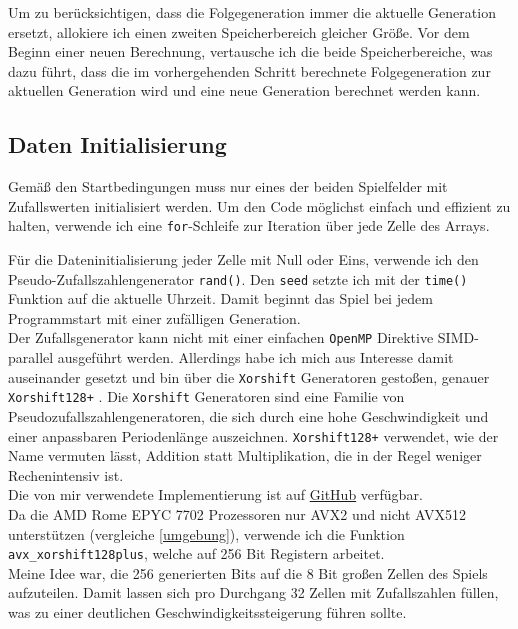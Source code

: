 \documentclass[german,plainarticle,hyperref,utf8]{zihpub}
\begin{document}
	Um zu berücksichtigen, dass die Folgegeneration immer die aktuelle Generation ersetzt, allokiere ich einen zweiten Speicherbereich gleicher Größe. Vor dem Beginn einer neuen Berechnung, vertausche ich die beide Speicherbereiche, was dazu führt, dass die im vorhergehenden Schritt berechnete Folgegeneration zur aktuellen Generation wird und eine neue Generation berechnet werden kann.
	
	\subsection{Daten Initialisierung} \label{data_init}
	Gemäß den Startbedingungen muss nur eines der beiden Spielfelder mit Zufallswerten initialisiert werden.
	Um den Code möglichst einfach und effizient zu halten, verwende ich eine \texttt{for}-Schleife zur Iteration über jede Zelle des Arrays.
	
	Für die Dateninitialisierung jeder Zelle mit Null oder Eins, verwende ich den Pseudo-Zufallszahlengenerator \texttt{rand()}. Den \texttt{seed} setzte ich mit der \texttt{time()} Funktion auf die aktuelle Uhrzeit. Damit beginnt das Spiel bei jedem Programmstart mit einer zufälligen Generation.\\

	Der Zufallsgenerator kann nicht mit einer einfachen \texttt{OpenMP} Direktive SIMD-parallel ausgeführt werden. Allerdings habe ich mich aus Interesse damit auseinander gesetzt und bin über die \texttt{Xorshift} Generatoren gestoßen, genauer \texttt{Xorshift128+} \cite{xor}. Die \texttt{Xorshift} Generatoren sind eine Familie von Pseudozufallszahlengeneratoren, die sich durch eine hohe Geschwindigkeit und einer anpassbaren Periodenlänge auszeichnen.
	\texttt{Xorshift128+} verwendet, wie der Name vermuten lässt, Addition statt Multiplikation, die in der Regel weniger Rechenintensiv ist.\\
	Die von mir verwendete Implementierung ist auf \href{https://github.com/lemire/SIMDxorshift}{GitHub} verfügbar.\\
	
	Da die AMD Rome EPYC 7702 Prozessoren nur AVX2 und nicht AVX512 unterstützen (vergleiche \ref{umgebung}), verwende ich die Funktion \texttt{avx\_xorshift128plus}, welche auf 256 Bit Registern arbeitet.\\
	Meine Idee war, die 256 generierten Bits auf die 8 Bit großen Zellen des Spiels aufzuteilen. Damit lassen sich pro Durchgang 32 Zellen mit Zufallszahlen füllen, was zu einer deutlichen Geschwindigkeitssteigerung führen sollte.
	
\end{document}
